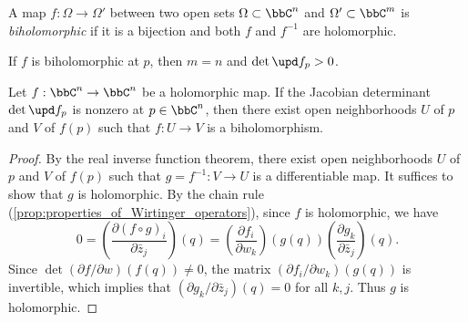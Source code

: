     \begin{definition}\label{def:biholomorphic_map}
        A map \(f: \Omega \to \Omega'\) between two open sets \(\Omega \subset \bbC^n\) and \(\Omega' \subset \bbC^m\) is \emph{biholomorphic} if it is a bijection and both \(f\) and \(f^{-1}\) are holomorphic.
    \end{definition}

    If \(f\) is biholomorphic at \(p\), then \(m = n\) and \(\det \upd f_p > 0\).

    \begin{theorem}\label{thm:holomorphic_inverse_function_theorem}
        Let \(f: \bbC^n \to \bbC^n\) be a holomorphic map. 
        If the Jacobian determinant \(\det \upd f_p\) is nonzero at \(p \in \bbC^n\), then there exist open neighborhoods \(U\) of \(p\) and \(V\) of \(f(p)\) such that \(f: U \to V\) is a biholomorphism.
    \end{theorem}
    \begin{proof}
        By the real inverse function theorem, there exist open neighborhoods \(U\) of \(p\) and \(V\) of \(f(p)\) such that \(g=f^{-1}: V \to U\) is a differentiable map.
        It suffices to show that \(g\) is holomorphic.
        By the chain rule (\cref{prop:properties_of_Wirtinger_operators}), since \(f\) is holomorphic, we have
        \[ 0 = \left(\frac{\partial (f\circ g)_i}{\partial \bar{z}_j}\right)(q) = \left(\frac{\partial f_i}{\partial w_k}\right)(g(q)) \left(\frac{\partial g_k}{\partial \bar{z}_j}\right)(q). \]
        Since \(\det(\partial f/\partial w)(f(q)) \neq 0\), the matrix \((\partial f_i/\partial w_k)(g(q))\) is invertible, which implies that \((\partial g_k/\partial \bar{z}_j)(q) = 0\) for all \(k,j\).
        Thus \(g\) is holomorphic.
    \end{proof}


